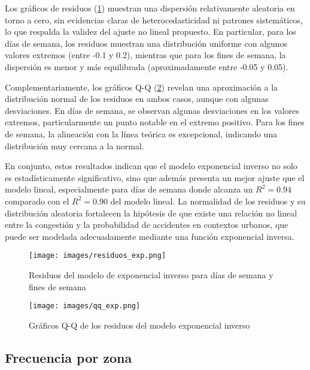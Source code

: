 \documentclass[12pt]{article}
\begin{document}
Los gráficos de residuos (\cref{fig:resid_exp}) muestran una dispersión relativamente aleatoria en torno a cero, sin evidencias claras de heterocedasticidad ni patrones sistemáticos, lo que respalda la validez del ajuste no lineal propuesto. En particular, para los días de semana, los residuos muestran una distribución uniforme con algunos valores extremos (entre -0.1 y 0.2), mientras que para los fines de semana, la dispersión es menor y más equilibrada (aproximadamente entre -0.05 y 0.05).

Complementariamente, los gráficos Q-Q (\cref{fig:qq_exp}) revelan una aproximación a la distribución normal de los residuos en ambos casos, aunque con algunas desviaciones. En días de semana, se observan algunas desviaciones en los valores extremos, particularmente un punto notable en el extremo positivo. Para los fines de semana, la alineación con la línea teórica es excepcional, indicando una distribución muy cercana a la normal.

En conjunto, estos resultados indican que el modelo exponencial inverso no solo es estadísticamente significativo, sino que además presenta un mejor ajuste que el modelo lineal, especialmente para días de semana donde alcanza un $R^2 = 0.94$ comparado con el $R^2 = 0.90$ del modelo lineal. La normalidad de los residuos y su distribución aleatoria fortalecen la hipótesis de que existe una relación no lineal entre la congestión y la probabilidad de accidentes en contextos urbanos, que puede ser modelada adecuadamente mediante una función exponencial inversa.


\begin{figure}[H]
\centering
\texttt{[image: images/residuos\_exp.png]}
\caption{Residuos del modelo de exponencial inverso para días de semana y fines de semana}
\label{fig:resid_exp}
\end{figure}

\begin{figure}[H]
\centering
\texttt{[image: images/qq\_exp.png]}
\caption{Gráficos Q-Q de los residuos del modelo exponencial inverso}
\label{fig:qq_exp}
\end{figure}


\subsection{Frecuencia por zona} \label{ssec:freq_zone}
\end{document}
